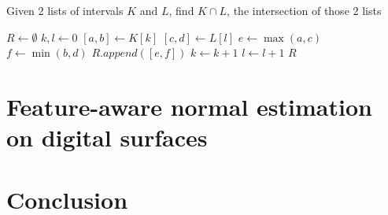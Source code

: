 \documentclass[runningheads]{llncs}
\begin{document}
    \begin{algorithm}
        \caption{Given 2 lists of intervals $K$ and $L$, find $K \cap L$, the intersection of those 2 lists}
        \label{alg:intersection}
        \begin{algorithmic}
                \State $R \gets \emptyset$
                \State $k, l \gets 0$
                    \State $[a,b] \gets K[k]$
                    \State $[c,d] \gets L[l]$
                    \State $e \gets \max(a, c)$
                    \State $f \gets \min(b, d)$
                        \State $R.append([e, f])$
                    \EndIf
                        \State $k \gets k+1$
                    \EndIf
                        \State $l \gets l+1$
                    \EndIf
                \EndWhile
                \State \Return $R$
            \EndFunction
        \end{algorithmic}
    \end{algorithm}



    \section{Feature-aware normal estimation on digital surfaces}



    \section{Conclusion}
\end{document}
